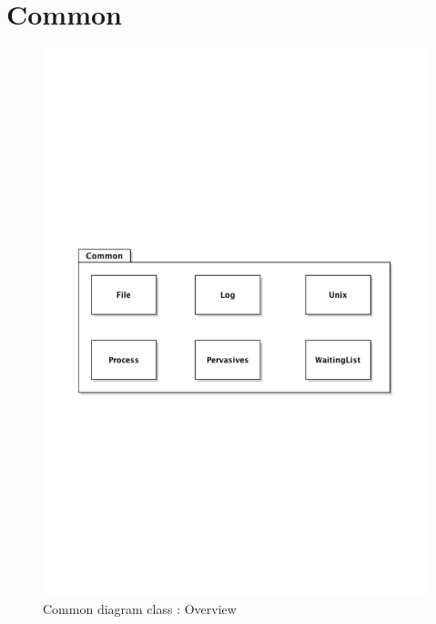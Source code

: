 \newpage
\section{Common}
	\begin{figure}[ht]
			\begin{center}
				\includegraphics[width=\textwidth,  trim=2cm 10cm 2cm 11cm]{UML_figure/DC/common/DC_Common.pdf}
				\caption{Common diagram class : Overview}
			\end{center}
		\end{figure}








